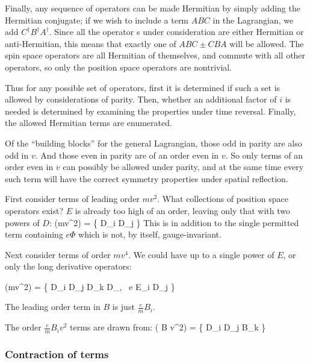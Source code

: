 Finally, any sequence of operators can be made Hermitian by simply adding the Hermitian conjugate; if we wish to include a term $ABC$ in the Lagrangian, we add $C^\dagger B^\dagger A^\dagger$.  Since all the operator	s under consideration are either Hermitian or anti-Hermitian, this means that exactly one of $ABC \pm CBA$ will be allowed.  The spin space operators are all Hermitian of themselves, and commute with all other operators, so only the position space operators are nontrivial.

Thus for any possible set of operators, first it is determined if such a set is allowed by considerations of parity.  Then, whether an additional factor of $i$ is needed is determined by examining the properties under time reversal.  Finally, the allowed Hermitian terms are enumerated.


Of the ``building blocks'' for the general Lagrangian, those odd in parity are also odd in $v$.  And those even in parity are of an order even in $v$.  So only terms of an order even in $v$ can possibly be allowed under parity, and at the same time every such term will have the correct symmetry properties under spatial reflection.

First consider terms of leading order $mv^2$.  What collections of position space operators exist?  $E$ is already too high of an order, leaving only that with two powers of $D$:
\beq
  (mv^2)  = \{  D_i D_j \} 
\eeq
This is in addition to the single permitted term containing $e\Phi$ which is not, by itself, gauge-invariant.
 
 Next consider terms of order $mv^4$.  We could have up to a single power of $E$, or only the long derivative operators:
 
\beq
  (mv^2)  = \{  D_i D_j D_k D_\ell, \,  e E_i D_j \} 
\eeq

The leading order term in $B$ is just $\frac{e}{m}B_i$.

The order $\frac{e}{m} B_i v^2$ terms are drawn from:
\beq
  ( B v^2)  = \{  D_i D_j B_k \}
\eeq


\subsubsection{Contraction of terms}

